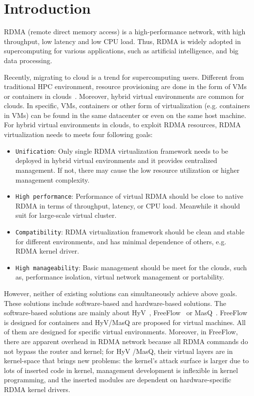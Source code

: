 \section{Introduction}
RDMA (remote direct memory access) is a high-performance network,  with high throughput, low latency and low CPU load. Thus, RDMA is widely adopted in supercomputing for various applications,  such as artificial intelligence, and big data processing. 

Recently, migrating to cloud is a trend for supercomputing users. Different from traditional HPC environment, resource provisioning are done in the form of VMs or containers in clouds~\cite{hpc-cloud}. Moreover, hybrid virtual environments are common for clouds. In specific, VMs, containers or other form of virtualization (e.g. containers in VMs) can be found in the same datacenter or even on the same host machine. For hybrid virtual environments in clouds,  to exploit RDMA resources, RDMA virtualization needs to meets four following goals:

\begin{itemize}
	\item {\verb|Unification|}: Only single RDMA virtualization framework needs to be deployed in hybrid virtual environments and it provides centralized management. If not, there may cause the low resource utilization or higher management complexity.
	\item {\verb|High performance|}: Performance of virtual RDMA should be close to native RDMA in terms of throughput, latency, or CPU load. Meanwhile it should suit for large-scale virtual cluster.
	\item {\verb|Compatibility|}: RDMA virtualization framework should be clean and stable for different environments, and has minimal dependence of others, e.g. RDMA kernel driver.
	\item {\verb|High manageability|}: Basic management should be meet for the clouds, such as, performance isolation, virtual network management or portability.
\end{itemize}

However, neither of existing solutions can simultaneously achieve above goals. These solutions include software-based and hardware-based solutions. The software-based solutions are mainly about HyV~\cite{pfefferle2015hybrid}, FreeFlow~\cite{kim2019freeflow} or MasQ~\cite{he2020masq}. FreeFlow is  designed for containers and HyV/MasQ are proposed for virtual machines. All of them are designed for specific virtual environments. Moreover, in FreeFlow, there are apparent overhead in RDMA network because all RDMA commands do not bypass the router and kernel; for HyV /MasQ, their virtual layers are in kernel-space that brings new problems: the kernel's attack surface is larger due to lots of inserted code in kernel, management development is inflexible in kernel programming, and the inserted modules are dependent on hardware-specific RDMA kernel drivers.

